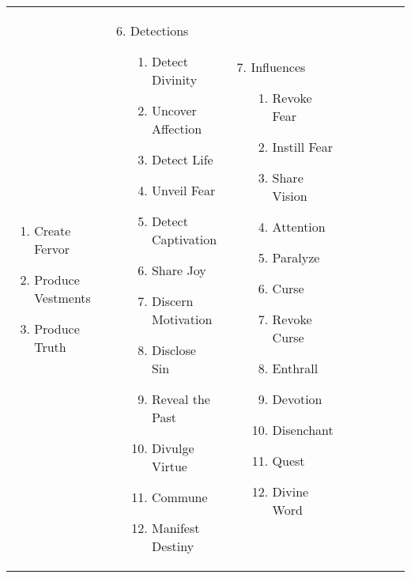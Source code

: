 \begin{tabular}{@{} p{0.25\linewidth} p{0.25\linewidth} p{0.25\linewidth} p{0.25\linewidth}}
\begin{enumerate}
\begin{enumerate}
		\item Create Fervor
		\item Produce Vestments
		\item Produce Truth
	\end{enumerate}
\end{enumerate} &
\begin{enumerate}
	\setcounter{enumi}{5}
	\item Detections
	\begin{enumerate}
		\item Detect Divinity
		\item Uncover Affection
		\item Detect Life
		\item Unveil Fear
		\item Detect Captivation
		\item Share Joy
		\item Discern Motivation
		\item Disclose Sin
		\item Reveal the Past
		\item Divulge Virtue
		\item Commune
		\item Manifest Destiny
	\end{enumerate}
\end{enumerate} &
\begin{enumerate}
	\setcounter{enumi}{6}
	\item Influences
	\begin{enumerate}
		\item Revoke Fear
		\item Instill Fear
		\item Share Vision
		\item Attention
		\item Paralyze
		\item Curse
		\item Revoke Curse
		\item Enthrall
		\item Devotion
		\item Disenchant
		\item Quest
		\item Divine Word
	\end{enumerate}
\end{enumerate}
\end{tabular}